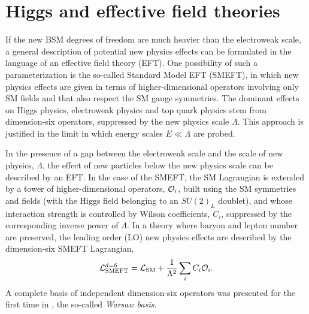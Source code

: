 \chapter{Higgs and effective field theories }\label{chap:HiggsEFT}
\par If the new BSM degrees of freedom are much heavier than the electroweak scale, a general description of potential new physics effects can be formulated in the language of an effective field theory (EFT). One possibility of such a parameterization is the so-called Standard Model EFT (SMEFT), in which new physics effects are given in terms of higher-dimensional operators involving only SM fields and that also respect the SM gauge symmetries.  The dominant effects on Higgs physics, electroweak physics and top quark physics stem from dimension-six operators, suppressed by the new physics scale $\Lambda$. This approach is justified in the limit 
in which energy scales $E\ll \Lambda$ are probed. 
 \par In the presence of a gap between the electroweak scale and the scale of new physics, $\Lambda$, the effect of new particles below the new physics scale can be described by an EFT. In the case of the SMEFT, the SM Lagrangian is extended by a tower of higher-dimensional operators, ${\cal O}_i$, built using the SM symmetries and fields (with the Higgs field belonging to an $SU(2)_L$ doublet), and whose interaction strength is controlled by Wilson coefficients, $C_i$, suppressed by the corresponding inverse power of $\Lambda$. In a theory where baryon and lepton number are preserved, the leading order (LO) new physics effects are described by the dimension-six  SMEFT Lagrangian,
%
\begin{equation}
	\mathcal{L}_{\mathrm{SMEFT}}^{d=6}=\mathcal{L}_{\mathrm{SM}} + \frac{1}{\Lambda^2}\sum_i C_i  {\cal O}_i.
\end{equation}
A complete basis of independent dimension-six operators was presented for the first time in \cite{Grzadkowski:2010es}, the so-called \textit{ Warsaw basis}.

